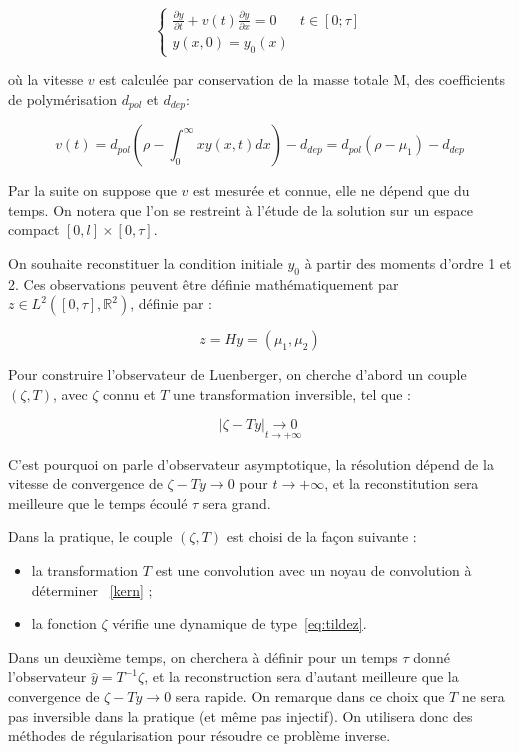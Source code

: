 \documentclass[a4paper]{article}
\newcommand{\mass}{\mathrm{M}}
\newcommand{\pol}{d_{pol}}
\newcommand{\dep}{d_{dep}}
\begin{document}
\begin{equation}
\label{eq:general}
\begin{cases}
 \frac{\partial y}{\partial t}+ v(t) \frac{\partial y} {\partial x}  = 0  & t \in [0;\tau]\\
 y(x,0) = y_{0} (x) 
\end{cases}
\end{equation}

où la vitesse $v$ est calculée par conservation de la masse totale $\mass$, des coefficients de polymérisation $\pol$ et $\dep$:

\[
v(t) = \pol(\rho - \int_0 ^\infty x y(x,t) dx)-\dep = \pol(\rho - \mu_1)-\dep
\]

Par la suite on suppose que $v$ est mesurée et connue, elle ne dépend que du temps. 
On notera que l'on se restreint à l'étude de la solution sur un espace compact $[0,l]\times[0,\tau]$.

On souhaite reconstituer la condition initiale $y_0$ à partir des moments d'ordre 1 et 2.
Ces observations peuvent être définie mathématiquement par $z \in L^2([0,\tau],\mathbb{R}^2)$, 
définie par :

\begin{equation}
	\label{obs}
	z = Hy = (\mu_1,\mu_2)
\end{equation}

Pour construire l'observateur de Luenberger, 
on cherche d'abord un couple $(\zeta,T)$, 
avec $\zeta$ connu et $T$ une transformation inversible, 
tel que :

\[
|\zeta - Ty| \underset{t\to+\infty}{\rightarrow 0}
\]

C'est pourquoi on parle d'observateur asymptotique,
la résolution dépend de la vitesse de convergence de $ \zeta - Ty \to 0$ pour $t \to + \infty$,
et la reconstitution sera meilleure que le temps écoulé $\tau$ sera grand.

Dans la pratique, le couple $(\zeta,T)$ est choisi de la façon suivante : 
\begin{itemize} 
\item la transformation $T$ est une convolution avec un noyau de convolution à déterminer ~\eqref{kern} ;
\item la fonction $\zeta$ vérifie une dynamique de type~\eqref{eq:tildez}.
\end{itemize}


Dans un deuxième temps,
on cherchera à définir pour un temps $\tau$ donné l'observateur $\hat{y} = T^{-1} \zeta$, 
et la reconstruction sera d'autant meilleure que la convergence de  $ \zeta - Ty \to 0$ sera rapide.
On remarque dans ce choix que $T$ ne sera pas inversible dans la pratique (et même pas injectif).
On utilisera donc des méthodes de régularisation pour résoudre ce problème inverse.
\end{document}
